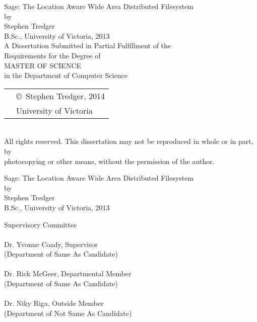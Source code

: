 \newcommand\thesistitle{Sage: The Location Aware Wide Area Distributed Filesystem}
\newcommand\nameanddegrees{%
Stephen Tredger\\
B.Sc., University of Victoria, 2013}
\newcommand\panel{%
\HRule\\\panelist{Dr. Yvonne Coady}{Supervisor}{Department of Same As Candidate}
\HRule\\\panelist{Dr. Rick McGeer}{Departmental Member}{Department of Same As Candidate}
\HRule\\\panelist{Dr. Niky Riga}{Outside Member}{Department of Not Same As Candidate}}
\newcommand\tpbreak{\\[\baselineskip]}

\newpage
\thispagestyle{empty}

\pagestyle{myheadings}


%
%
\pagebreak
{
\centering
\thesistitle
\tpbreak
by
\tpbreak
\nameanddegrees
\tpbreak
A Dissertation Submitted in Partial Fulfillment of the \\
Requirements for the Degree of
\tpbreak
MASTER OF SCIENCE
\tpbreak
in the Department of Computer Science\\
\vfill
\begin{tabular}{cl}
& \copyright\ Stephen Tredger, 2014\\
& \phantom{\copyright} University of Victoria
\end{tabular}
\tpbreak
All rights reserved. This dissertation may not be reproduced in whole or in part, by \\
\hfill photocopying or other means, without the permission of the author. 
\hfill
}
\pagebreak

%
%
\newpage
{}

{
\centering
\thesistitle
\tpbreak
by
\tpbreak
\nameanddegrees
\tpbreak
}

\newcommand\panelist[3]{\noindent #1, #2\\\noindent(#3)\tpbreak}
\vfill
\noindent Supervisory Committee
\tpbreak
\panel
\vfill
\pagebreak

